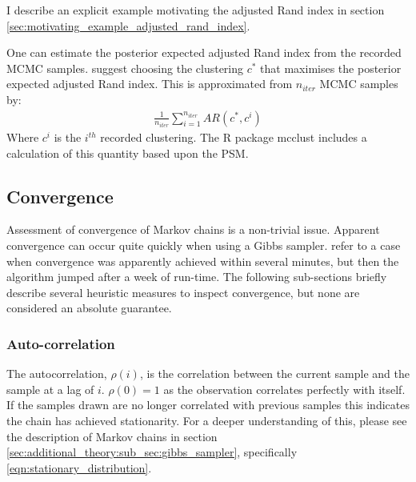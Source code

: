 \documentclass[12pt]{article} %
\begin{document}
	I describe an explicit example motivating the adjusted Rand index in section \ref{sec:motivating_example_adjusted_rand_index}.
	
	One can estimate the posterior expected adjusted Rand index from the recorded MCMC samples. \citet{FritschImprovedcriteriaclustering2009} suggest choosing the clustering $c^*$ that maximises the posterior expected adjusted Rand index. This is approximated from $n_{iter}$ MCMC samples by:
	\begin{align} \label{eqn:PEAR}
	\frac{1}{n_{iter}}\sum_{i=1}^{n_{iter}} AR(c^*, c^i)
	\end{align}
	Where $c^i$ is the $i^{th}$ recorded clustering. The R package mcclust \citep{FritschMcclust2012} includes a calculation of this quantity based upon the PSM.
	
	\subsection{Convergence}
	Assessment of convergence of Markov chains is a non-trivial issue. Apparent convergence can occur quite quickly when using a Gibbs sampler. \citet{ripley1990iterative} refer to a case when convergence was apparently achieved within several minutes, but then the algorithm jumped after a week of run-time. The following sub-sections briefly describe several heuristic measures to inspect convergence, but none are considered an absolute guarantee.
	
	\subsubsection{Auto-correlation} \label{sec:additional_theory:sub_sec:convergence:sub_sub_sec:autocorrelation}
	The autocorrelation, $\rho(i)$, is the correlation between the current sample and the sample at a lag of $i$. $\rho(0)=1$ as the observation correlates perfectly with itself. If the samples drawn are no longer correlated with previous samples this indicates the chain has achieved stationarity. For a deeper understanding of this, please see the description of Markov chains in section \ref{sec:additional_theory:sub_sec:gibbs_sampler}, specifically \eqref{eqn:stationary_distribution}.
	
\end{document}
